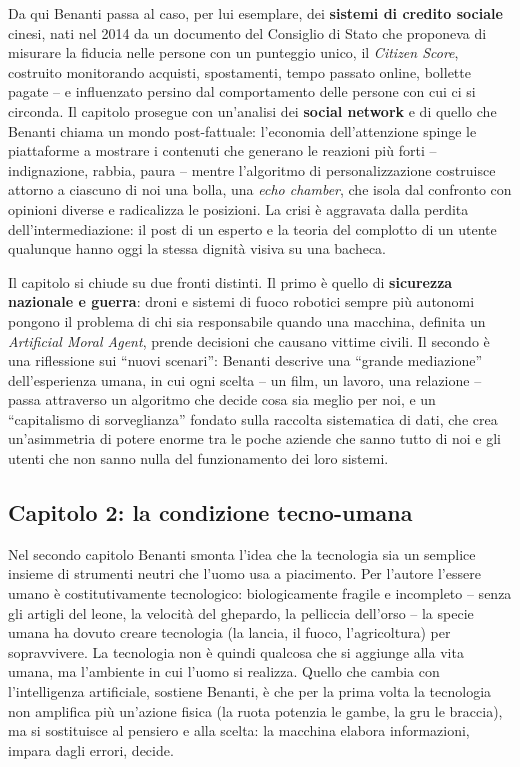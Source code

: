 \documentclass[a4paper,11pt]{article}
\begin{document}
Da qui Benanti passa al caso, per lui esemplare, dei \textbf{sistemi di credito sociale} cinesi, nati nel 2014 da un documento del Consiglio di Stato che proponeva di misurare la fiducia nelle persone con un punteggio unico, il \emph{Citizen Score}, costruito monitorando acquisti, spostamenti, tempo passato online, bollette pagate -- e influenzato persino dal comportamento delle persone con cui ci si circonda. Il capitolo prosegue con un'analisi dei \textbf{social network} e di quello che Benanti chiama un mondo post-fattuale: l'economia dell'attenzione spinge le piattaforme a mostrare i contenuti che generano le reazioni più forti -- indignazione, rabbia, paura -- mentre l'algoritmo di personalizzazione costruisce attorno a ciascuno di noi una bolla, una \emph{echo chamber}, che isola dal confronto con opinioni diverse e radicalizza le posizioni. La crisi è aggravata dalla perdita dell'intermediazione: il post di un esperto e la teoria del complotto di un utente qualunque hanno oggi la stessa dignità visiva su una bacheca.

Il capitolo si chiude su due fronti distinti. Il primo è quello di \textbf{sicurezza nazionale e guerra}: droni e sistemi di fuoco robotici sempre più autonomi pongono il problema di chi sia responsabile quando una macchina, definita un \emph{Artificial Moral Agent}, prende decisioni che causano vittime civili. Il secondo è una riflessione sui ``nuovi scenari'': Benanti descrive una ``grande mediazione'' dell'esperienza umana, in cui ogni scelta -- un film, un lavoro, una relazione -- passa attraverso un algoritmo che decide cosa sia meglio per noi, e un ``capitalismo di sorveglianza'' fondato sulla raccolta sistematica di dati, che crea un'asimmetria di potere enorme tra le poche aziende che sanno tutto di noi e gli utenti che non sanno nulla del funzionamento dei loro sistemi.

\subsection{Capitolo 2: la condizione tecno-umana}

Nel secondo capitolo Benanti smonta l'idea che la tecnologia sia un semplice insieme di strumenti neutri che l'uomo usa a piacimento. Per l'autore l'essere umano è costitutivamente tecnologico: biologicamente fragile e incompleto -- senza gli artigli del leone, la velocità del ghepardo, la pelliccia dell'orso -- la specie umana ha dovuto creare tecnologia (la lancia, il fuoco, l'agricoltura) per sopravvivere. La tecnologia non è quindi qualcosa che si aggiunge alla vita umana, ma l'ambiente in cui l'uomo si realizza. Quello che cambia con l'intelligenza artificiale, sostiene Benanti, è che per la prima volta la tecnologia non amplifica più un'azione fisica (la ruota potenzia le gambe, la gru le braccia), ma si sostituisce al pensiero e alla scelta: la macchina elabora informazioni, impara dagli errori, decide.
\end{document}
